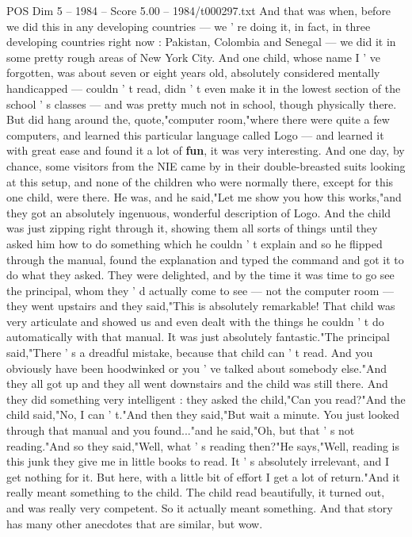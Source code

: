 \begin{textsample}{POS Dim 5 – 1984 – Score 5.00 – 1984/t000297.txt}
And that was when, before we did this in any developing countries — we ' re doing it, in fact, in three developing countries right now : Pakistan, Colombia and Senegal — we did it in some pretty rough areas of New York City.
And one child, whose name I ' ve forgotten, was about seven or eight years old, absolutely considered mentally handicapped — couldn ' t read, didn ' t even make it in the lowest section of the school ' s classes — and was pretty much not in school, though physically there.
But did hang around the, quote,"computer room,"where there were quite a few computers, and learned this particular language called Logo — and learned it with great ease and found it a lot of \textbf{fun}, it was very interesting.
And one day, by chance, some visitors from the NIE came by in their double-breasted suits looking at this setup, and none of the children who were normally there, except for this one child, were there.
He was, and he said,"Let me show you how this works,"and they got an absolutely ingenuous, wonderful description of Logo.
And the child was just zipping right through it, showing them all sorts of things until they asked him how to do something which he couldn ' t explain and so he flipped through the manual, found the explanation and typed the command and got it to do what they asked.
They were delighted, and by the time it was time to go see the principal, whom they ' d actually come to see — not the computer room — they went upstairs and they said,"This is absolutely remarkable!
That child was very articulate and showed us and even dealt with the things he couldn ' t do automatically with that manual.
It was just absolutely fantastic."The principal said,"There ' s a dreadful mistake, because that child can ' t read.
And you obviously have been hoodwinked or you ' ve talked about somebody else."And they all got up and they all went downstairs and the child was still there.
And they did something very intelligent : they asked the child,"Can you read?"And the child said,"No, I can ' t."And then they said,"But wait a minute.
You just looked through that manual and you found..."and he said,"Oh, but that ' s not reading."And so they said,"Well, what ' s reading then?"He says,"Well, reading is this junk they give me in little books to read.
It ' s absolutely irrelevant, and I get nothing for it.
But here, with a little bit of effort I get a lot of return."And it really meant something to the child.
The child read beautifully, it turned out, and was really very competent.
So it actually meant something.
And that story has many other anecdotes that are similar, but wow.

\end{textsample}
